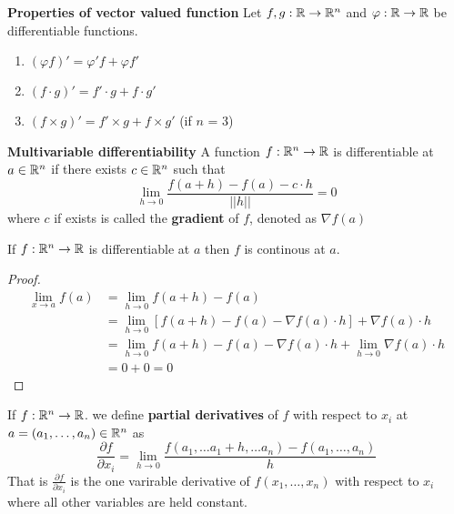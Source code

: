 \documentclass[11pt]{article}
\begin{document}
\begin{proposition}
  \label{Properties of vector valued function} \textbf{Properties of vector valued function} Let $f,g:\mathbb{R}\rightarrow \mathbb{R}^n$ and $\varphi: \mathbb{R}\rightarrow \mathbb{R}$ be differentiable functions.
  \begin{enumerate}
    \item $(\varphi f)' = \varphi'f + \varphi f'$
    \item $(f\cdot g)' = f'\cdot g + f\cdot g'$
    \item $(f\times g)' = f' \times g + f \times g'$  (if $n$ = 3)
  \end{enumerate}
\end{proposition}

\begin{defn}
  \label{multivariable differentiability}
  \textbf{Multivariable differentiability}
  A function $f:\mathbb{R}^n \rightarrow \mathbb{R}$ is differentiable at $a\in\mathbb{R}^n$ if there exists $c\in\mathbb{R}^n$ such that
  \[
    \lim_{h\to 0} \frac{f(a+h) - f(a) - c\cdot h}{|| h ||} = 0
  \]
  where $c$ if exists is called the \textbf{gradient} of $f$, denoted as $\nabla f(a)$
\end{defn}

\begin{theorem}
  \label{differentiability implies continuity}
  If $f:\mathbb{R}^n \rightarrow \mathbb{R}$ is differentiable at $a$ then $f$ is continous at $a$.
  \begin{proof}
    $ $\\
    \begin{align*}
      \lim_{x\to a} f(a)&= \lim_{h\to 0} f(a+h)-f(a) \\
      &= \lim_{h\to 0} [f(a+h)-f(a) - \nabla f(a)\cdot h] + \nabla f(a)\cdot h \\
      &= \lim_{h\to 0} f(a+h)-f(a) - \nabla f(a)\cdot h + \lim_{h\to 0} \nabla f(a)\cdot h\\
      &= 0 + 0 = 0
    \end{align*}
  \end{proof}
\end{theorem}



\begin{defn}
  \label{partial derivatives}
  If $f:\mathbb{R}^n \to \mathbb{R}$. we define \textbf{partial derivatives} of $f$ with respect to $x_i$ at $a=(a_1, \dots, a_n)\in \mathbb{R}^n$ as
  \[
    \frac{\partial f}{\partial x_i} = \lim_{h\to 0}\frac{f(a_1, \dots a_1 + h, \dots a_n) - f(a_1, \dots, a_n)}{h}
  \]
  That is $\frac{\partial f}{\partial x_i}$ is the one varirable derivative of $f(x_1, \dots, x_n)$ with respect to $x_i$ where all other variables are held constant.
\end{defn}
\end{document}
